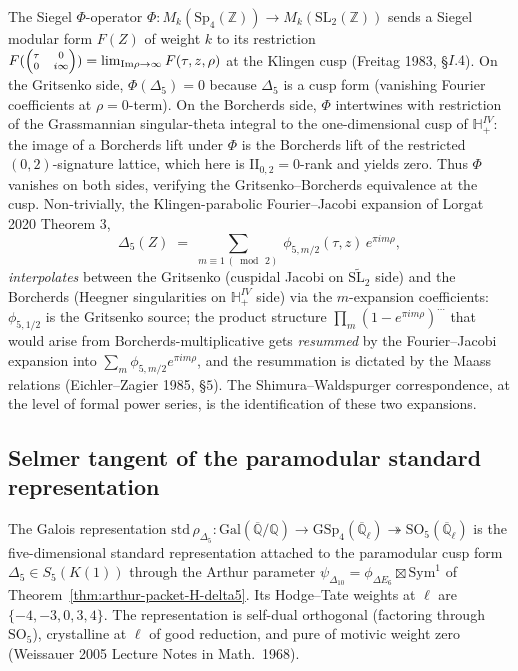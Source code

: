\begin{remark}
\label{rem:siegel-phi-operator-interpolation}
The Siegel $\Phi$-operator
$\Phi\colon M_k(\mathrm{Sp}_4(\mathbb{Z}))\to M_k(\mathrm{SL}_2(\mathbb{Z}))$ sends a
Siegel modular form $F(Z)$ of weight $k$ to its restriction
$F({\scriptsize\begin{pmatrix}\tau & 0\\0 & i\infty\end{pmatrix}}) = \lim_{\mathrm{Im}\rho\to\infty} F(\tau,z,\rho)$
at the Klingen cusp (Freitag 1983, \S $I.4$). On the Gritsenko side,
$\Phi(\Delta_5) = 0$ because $\Delta_5$ is a cusp form (vanishing Fourier coefficients
at $\rho = 0$-term). On the Borcherds side, $\Phi$ intertwines with restriction of the
Grassmannian singular-theta integral to the one-dimensional cusp of
$\mathbb{H}^{IV}_+$: the image of a Borcherds lift under $\Phi$ is the Borcherds lift
of the restricted $(0,2)$-signature lattice, which here is $\mathrm{II}_{0,2}
= 0$-rank and yields zero. Thus $\Phi$ vanishes on both sides, verifying the
Gritsenko--Borcherds equivalence at the cusp. Non-trivially, the Klingen-parabolic
Fourier--Jacobi expansion of Lorgat 2020 Theorem $3$,
\[
 \Delta_5(Z)
 \;=\;
 \sum_{m\equiv 1\,(\bmod\,2)}\, \phi_{5,m/2}(\tau,z)\, e^{\pi i m\rho},
\]
\emph{interpolates} between the Gritsenko (cuspidal Jacobi on
$\widetilde{\mathrm{SL}_2}$ side) and the Borcherds (Heegner singularities on
$\mathbb{H}^{IV}_+$ side) via the $m$-expansion coefficients: $\phi_{5,1/2}$ is the
Gritsenko source; the product structure
$\prod_m (1 - e^{\pi i m\rho})^{\cdots}$ that would arise from Borcherds-multiplicative
gets \emph{resummed} by the Fourier--Jacobi expansion into $\sum_m \phi_{5,m/2}
e^{\pi i m\rho}$, and the resummation is dictated by the Maass relations
(Eichler--Zagier 1985, \S $5$). The Shimura--Waldspurger correspondence, at the level
of formal power series, is the identification of these two expansions.
\end{remark}

\subsection{Selmer tangent of the paramodular standard representation}
\label{subsec:selmer-tangent-delta5-std}

The Galois representation $\mathrm{std}\,\rho_{\Delta_5}\colon
\mathrm{Gal}(\overline{\mathbb{Q}}/\mathbb{Q})\to \mathrm{GSp}_4(\overline{\mathbb{Q}}_\ell)
\twoheadrightarrow \mathrm{SO}_5(\overline{\mathbb{Q}}_\ell)$ is the five-dimensional
standard representation attached to the paramodular cusp form
$\Delta_5 \in S_5(K(1))$ through the Arthur parameter
$\psi_{\Delta_{10}} = \phi_{\Delta E_6}\boxtimes\mathrm{Sym}^1$ of
Theorem~\ref{thm:arthur-packet-H-delta5}. Its Hodge--Tate weights at $\ell$ are
$\{-4,-3,0,3,4\}$. The representation is self-dual orthogonal (factoring through
$\mathrm{SO}_5$), crystalline at $\ell$ of good reduction, and pure of motivic
weight zero (Weissauer 2005 \textup{Lecture Notes in Math.}~1968).

